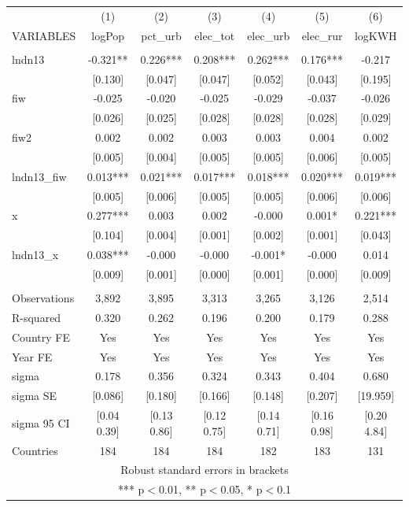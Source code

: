 \begin{tabular}{lcccccc} \hline
 & (1) & (2) & (3) & (4) & (5) & (6) \\
VARIABLES & logPop & pct\_urb & elec\_tot & elec\_urb & elec\_rur & logKWH \\ \hline
 &  &  &  &  &  &  \\
lndn13 & -0.321** & 0.226*** & 0.208*** & 0.262*** & 0.176*** & -0.217 \\
 & [0.130] & [0.047] & [0.047] & [0.052] & [0.043] & [0.195] \\
fiw & -0.025 & -0.020 & -0.025 & -0.029 & -0.037 & -0.026 \\
 & [0.026] & [0.025] & [0.028] & [0.028] & [0.028] & [0.029] \\
fiw2 & 0.002 & 0.002 & 0.003 & 0.003 & 0.004 & 0.002 \\
 & [0.005] & [0.004] & [0.005] & [0.005] & [0.006] & [0.005] \\
lndn13\_fiw & 0.013*** & 0.021*** & 0.017*** & 0.018*** & 0.020*** & 0.019*** \\
 & [0.005] & [0.006] & [0.005] & [0.005] & [0.006] & [0.006] \\
x & 0.277*** & 0.003 & 0.002 & -0.000 & 0.001* & 0.221*** \\
 & [0.104] & [0.004] & [0.001] & [0.002] & [0.001] & [0.043] \\
lndn13\_x & 0.038*** & -0.000 & -0.000 & -0.001* & -0.000 & 0.014 \\
 & [0.009] & [0.001] & [0.000] & [0.001] & [0.000] & [0.009] \\
 &  &  &  &  &  &  \\
Observations & 3,892 & 3,895 & 3,313 & 3,265 & 3,126 & 2,514 \\
R-squared & 0.320 & 0.262 & 0.196 & 0.200 & 0.179 & 0.288 \\
Country FE & Yes & Yes & Yes & Yes & Yes & Yes \\
Year FE & Yes & Yes & Yes & Yes & Yes & Yes \\
sigma & 0.178 & 0.356 & 0.324 & 0.343 & 0.404 & 0.680 \\
sigma SE & [0.086] & [0.180] & [0.166] & [0.148] & [0.207] & [19.959] \\
sigma 95 CI & [0.04 0.39] & [0.13 0.86] & [0.12 0.75] & [0.14 0.71] & [0.16 0.98] & [0.20 4.84] \\
 Countries & 184 & 184 & 184 & 182 & 183 & 131 \\ \hline
\multicolumn{7}{c}{ Robust standard errors in brackets} \\
\multicolumn{7}{c}{ *** p$<$0.01, ** p$<$0.05, * p$<$0.1} \\
\end{tabular}

